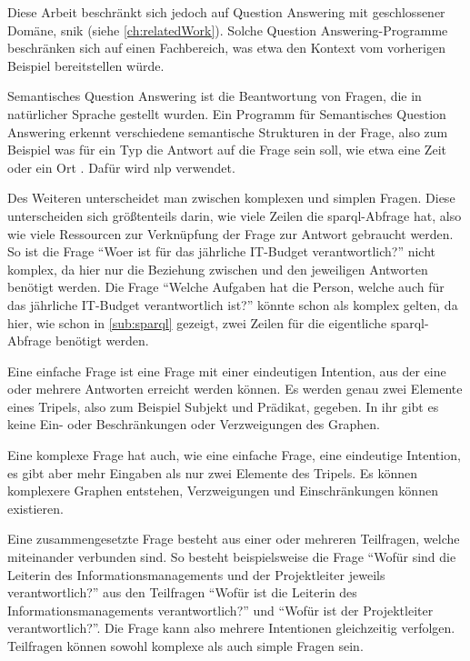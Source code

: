 Diese Arbeit beschränkt sich jedoch auf Question Answering mit geschlossener Domäne, \ac{snik} (siehe \cref{ch:relatedWork}).
Solche Question Answering-Programme beschränken sich auf einen Fachbereich,
was etwa den Kontext vom vorherigen Beispiel bereitstellen würde.

\begin{definition}
Semantisches Question Answering ist die Beantwortung von Fragen, die in natürlicher Sprache gestellt wurden.
Ein Programm für Semantisches Question Answering erkennt verschiedene semantische Strukturen in der Frage,
also zum Beispiel was für ein Typ die Antwort auf die Frage sein soll, wie etwa eine Zeit oder ein Ort \citep{sqadefinition}.
Dafür wird \acs{nlp} verwendet.
\end{definition}

Des Weiteren unterscheidet man zwischen komplexen und simplen Fragen.
Diese unterscheiden sich größtenteils darin, wie viele Zeilen die \ac{sparql}-Abfrage hat, also wie viele Ressourcen zur Verknüpfung der Frage zur Antwort gebraucht werden.
So ist die Frage \enquote{Woer ist für das jährliche IT-Budget verantwortlich?} nicht komplex,
da hier nur die Beziehung zwischen  und den jeweiligen Antworten benötigt werden.
Die Frage \enquote{Welche Aufgaben hat die Person, welche auch für das jährliche IT-Budget verantwortlich ist?} könnte schon als komplex gelten, da hier, wie schon in \cref{sub:sparql} gezeigt,
zwei Zeilen für die eigentliche \ac{sparql}-Abfrage benötigt werden.

\begin{definition}\label{def:efrage}
Eine einfache Frage ist eine Frage mit einer eindeutigen Intention, aus der eine oder mehrere Antworten erreicht werden können.
Es werden genau zwei Elemente eines Tripels, also zum Beispiel Subjekt und Prädikat, gegeben.
In ihr gibt es keine Ein- oder Beschränkungen oder Verzweigungen des Graphen.
\end{definition}

\begin{definition}\label{def:kfrage}
Eine komplexe Frage hat auch, wie eine einfache Frage, eine eindeutige Intention, es gibt aber mehr Eingaben als nur zwei Elemente des Tripels.
Es können komplexere Graphen entstehen, Verzweigungen und Einschränkungen können existieren.
\end{definition}

\begin{definition}\label{def:zfrage}
Eine zusammengesetzte Frage besteht aus einer oder mehreren Teilfragen, welche miteinander verbunden sind.
So besteht beispielsweise die Frage \enquote{Wofür sind die Leiterin des Informationsmanagements und der Projektleiter jeweils verantwortlich?} aus den Teilfragen
\enquote{Wofür ist die Leiterin des Informationsmanagements verantwortlich?} und \enquote{Wofür ist der Projektleiter verantwortlich?}.
Die Frage kann also mehrere Intentionen gleichzeitig verfolgen.
Teilfragen können sowohl komplexe als auch simple Fragen sein.
\end{definition}

